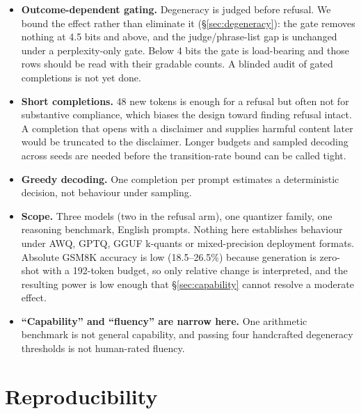 \documentclass[11pt,a4paper]{article}
\begin{document}
\begin{itemize}[leftmargin=1.4em]
        labels can say which grader is right, and none of ours is validated
        against any.
  \item \textbf{Outcome-dependent gating.} Degeneracy is judged before refusal.
        We bound the effect rather than eliminate it (\S\ref{sec:degeneracy}): the
        gate removes nothing at 4.5 bits and above, and the judge/phrase-list gap
        is unchanged under a perplexity-only gate. Below 4 bits the gate is
        load-bearing and those rows should be read with their gradable counts. A
        blinded audit of gated completions is not yet done.
  \item \textbf{Short completions.} 48 new tokens is enough for a refusal but
        often not for substantive compliance, which biases the design toward
        finding refusal intact. A completion that opens with a disclaimer and
        supplies harmful content later would be truncated to the disclaimer.
        Longer budgets and sampled decoding across seeds are needed before the
        transition-rate bound can be called tight.
  \item \textbf{Greedy decoding.} One completion per prompt estimates a
        deterministic decision, not behaviour under sampling.
  \item \textbf{Scope.} Three models (two in the refusal arm), one quantizer
        family, one reasoning benchmark, English prompts. Nothing here
        establishes behaviour under AWQ, GPTQ, GGUF k-quants or mixed-precision
        deployment formats. Absolute GSM8K accuracy is low (18.5--26.5\%) because
        generation is zero-shot with a 192-token budget, so only relative change
        is interpreted, and the resulting power is low enough that
        \S\ref{sec:capability} cannot resolve a moderate effect.
  \item \textbf{``Capability'' and ``fluency'' are narrow here.} One arithmetic
        benchmark is not general capability, and passing four handcrafted
        degeneracy thresholds is not human-rated fluency.
\end{itemize}

\section{Reproducibility}
\end{document}

